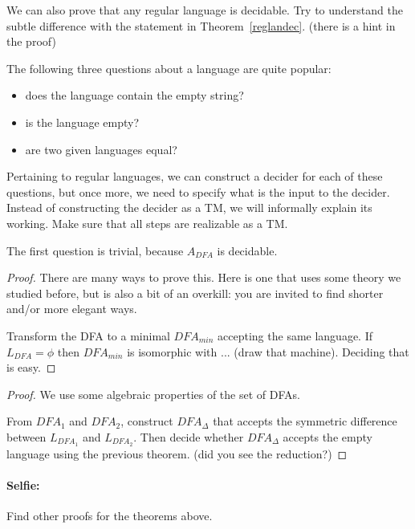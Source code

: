 We can also prove that any regular language is decidable. Try to
understand the subtle difference with the statement in
Theorem~\ref{reglandec}. (there is a hint in the proof)

The following three questions about a language are quite popular:
\begin{itemize}
\item does the language contain the empty string?
\item is the language empty?
\item are two given languages equal?
\end{itemize}

Pertaining to regular languages, we can construct a decider for each
of these questions, but once more, we need to specify what is the
input to the decider. Instead of constructing the decider as a TM, we
will informally explain its working. Make sure that all steps are
realizable as a TM.


The first question is trivial, because $A_{DFA}$ is decidable.


\begin{proof}
There are many ways to prove this. Here is one that uses some theory
we studied before, but is also a bit of an overkill: you are invited
to find shorter and/or more elegant ways.

Transform the DFA to a minimal $DFA_{min}$ accepting the same language.
If $L_{DFA} = \phi$ then $DFA_{min}$ is isomorphic with ... (draw that
machine). Deciding that is easy.
\end{proof}



\begin{proof}
We use some algebraic properties of the set of DFAs.

From $DFA_1$ and $DFA_2$, construct $DFA_\Delta$ that accepts the
symmetric difference between $L_{DFA_1}$ and $L_{DFA_2}$. Then decide
whether $DFA_\Delta$ accepts the empty language using the previous
theorem. (did you see the reduction?)
\end{proof}


\paragraph{Selfie:} Find other proofs for the theorems above.

